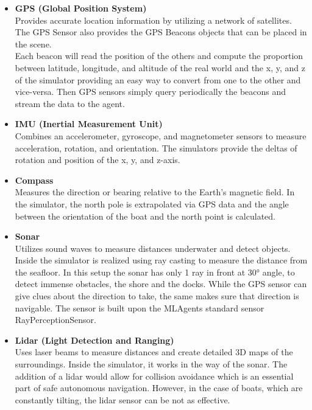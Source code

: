 \begin{itemize}

\item {\bf GPS (Global Position System) }\\
Provides accurate location information by utilizing a network of satellites. The GPS Sensor also provides the GPS Beacons objects that can be placed in the scene. \\
Each beacon will read the position of the others and compute the proportion between latitude, longitude, and altitude of the real world and the x, y, and z of the simulator providing an easy way to convert from one to the other and vice-versa.
Then GPS sensors simply query periodically the beacons and stream the data to the agent.


\item {\bf IMU (Inertial Measurement Unit) }\\
Combines an accelerometer, gyroscope, and magnetometer sensors to measure acceleration, rotation, and orientation. The simulators provide the deltas of rotation and position of the x, y, and z-axis.


\item {\bf Compass }\\
Measures the direction or bearing relative to the Earth's magnetic field. In the simulator, the north pole is extrapolated via GPS data and the angle between the orientation of the boat and the north point is calculated.


\item {\bf Sonar }\\
Utilizes sound waves to measure distances underwater and detect objects. Inside the simulator is realized using ray casting to measure the distance from the seafloor. In this setup the sonar has only 1 ray in front at 30° angle, to detect immense obstacles, the shore and the docks. While the GPS sensor can give clues about the direction to take, the same makes sure that direction is navigable. The sensor is built upon the MLAgents standard sensor RayPerceptionSensor.


\item {\bf Lidar (Light Detection and Ranging)  }\\
Uses laser beams to measure distances and create detailed 3D maps of the surroundings. Inside the simulator, it works in the way of the sonar. The addition of a lidar would allow for collision avoidance which is an essential part of safe autonomous navigation. However, in the case of boats, which are constantly tilting, the lidar sensor can be not as effective.



\end{itemize}

